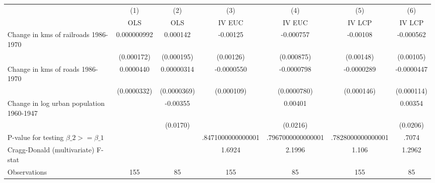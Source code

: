 {
\def\sym#1{\ifmmode^{#1}\else\(^{#1}\)\fi}
\begin{tabular}{l*{6}{c}}
\hline\hline
                &\multicolumn{1}{c}{(1)}&\multicolumn{1}{c}{(2)}&\multicolumn{1}{c}{(3)}&\multicolumn{1}{c}{(4)}&\multicolumn{1}{c}{(5)}&\multicolumn{1}{c}{(6)}\\
                &\multicolumn{1}{c}{OLS}&\multicolumn{1}{c}{OLS}&\multicolumn{1}{c}{IV EUC}&\multicolumn{1}{c}{IV EUC}&\multicolumn{1}{c}{IV LCP}&\multicolumn{1}{c}{IV LCP}\\
\hline
Change in kms of railroads 1986-1970&0.000000992         & 0.000142         & -0.00125         &-0.000757         & -0.00108         &-0.000562         \\
                &(0.000172)         &(0.000195)         &(0.00126)         &(0.000875)         &(0.00148)         &(0.00105)         \\
[1em]
Change in kms of roads 1986-1970&0.0000440         &0.00000314         &-0.0000550         &-0.0000798         &-0.0000289         &-0.0000447         \\
                &(0.0000332)         &(0.0000369)         &(0.000109)         &(0.0000780)         &(0.000146)         &(0.000114)         \\
[1em]
Change in log urban population 1960-1947&                  & -0.00355         &                  &  0.00401         &                  &  0.00354         \\
                &                  & (0.0170)         &                  & (0.0216)         &                  & (0.0206)         \\
\hline
P-value for testing $\beta\_{2} >= \beta\_{1}$&                  &                  &.8471000000000001         &.7967000000000001         &.7828000000000001         &    .7074         \\
Cragg-Donald (multivariate) F-stat&                  &                  &   1.6924         &   2.1996         &    1.106         &   1.2962         \\
Observations    &      155         &       85         &      155         &       85         &      155         &       85         \\
\hline\hline
\end{tabular}
}

